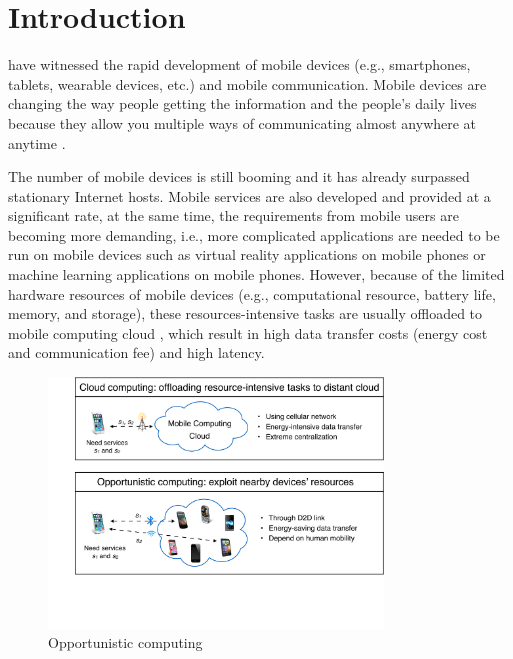\documentclass[10pt,journal,compsoc]{IEEEtran}
\begin{document}
\IEEEdisplaynontitleabstractindextext

\IEEEpeerreviewmaketitle


\ifCLASSOPTIONcompsoc
{}
\else
\section{Introduction}
\label{sec:introduction}
\fi


 have witnessed the rapid development of mobile devices (e.g., smartphones, tablets, wearable devices, etc.) and mobile communication. Mobile devices are changing the way people getting the information and the people’s daily lives because they allow you multiple ways of communicating almost anywhere at anytime \cite{satyanarayanan2010mobile}.

The number of mobile devices is still booming and it has already surpassed stationary Internet hosts.
Mobile services are also developed and provided at a significant rate, at the same time, the requirements from mobile users are becoming more demanding, i.e., more complicated applications are needed to be run on mobile devices such as virtual reality applications on mobile phones \cite{bastug2017toward} or machine learning applications \cite{abadi2016tensorflow} on mobile phones. However, because of the limited hardware resources of mobile devices (e.g., computational resource, battery life, memory, and storage), these resources-intensive tasks are usually offloaded to mobile computing cloud \cite{dinh2013survey}, which result in high data transfer costs (energy cost and communication fee) and high latency.

\begin{figure}[!t]
\centering
\includegraphics[width=3.5in]{./img/pic1.pdf}
\caption{Opportunistic computing}
\label{Opportunistic computing}
\end{figure}
\end{document}
